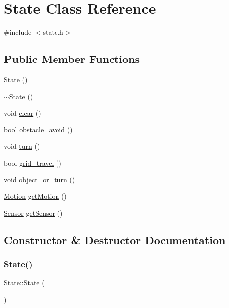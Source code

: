 \hypertarget{class_state}{}\section{State Class Reference}
\label{class_state}


{\ttfamily \#include $<$state.\+h$>$}

\subsection*{Public Member Functions}
\begin{DoxyCompactItemize}
\item 
\mbox{\hyperlink{class_state_ab91bb1dd5aa6260ab2a456581daf9ec2}{State}} ()
\item 
\mbox{\hyperlink{class_state_afab438d92b90dc18d194dbd9c9c8bab3}{$\sim$\+State}} ()
\item 
void \mbox{\hyperlink{class_state_aed3bf8334ee32e0cccba11fc2dc42b68}{clear}} ()
\item 
bool \mbox{\hyperlink{class_state_a975afaa8e6091654888d7ed58b8c29c1}{obstacle\+\_\+avoid}} ()
\item 
void \mbox{\hyperlink{class_state_ae5ed95e28512e11f7cc41c603ca58ad5}{turn}} ()
\item 
bool \mbox{\hyperlink{class_state_a4e9d67c11218113bfa282ddccfd6326a}{grid\+\_\+travel}} ()
\item 
void \mbox{\hyperlink{class_state_ae03eae00675106f8b6b9481c4b0e50dc}{object\+\_\+or\+\_\+turn}} ()
\item 
\mbox{\hyperlink{class_motion}{Motion}} \mbox{\hyperlink{class_state_adcabc610335b5bd9efdf7f908de7dacb}{get\+Motion}} ()
\item 
\mbox{\hyperlink{class_sensor}{Sensor}} \mbox{\hyperlink{class_state_a9195abef447816fe4830f875f0b1dda2}{get\+Sensor}} ()
\end{DoxyCompactItemize}


\subsection{Constructor \& Destructor Documentation}
\mbox{\label{class_state_ab91bb1dd5aa6260ab2a456581daf9ec2}} 
\subsubsection{\texorpdfstring{State()}{State()}}
{\footnotesize\ttfamily State\+::\+State (\begin{DoxyParamCaption}{ }\end{DoxyParamCaption})}

